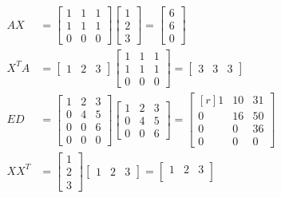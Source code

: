 \begin{align*}
	A X
	&=
	\begin{bmatrix*}
		1 & 1 & 1\\
		1 & 1 & 1\\
		0 & 0 & 0
	\end{bmatrix*}
	\begin{bmatrix*}
		1\\
		2\\
		3
	\end{bmatrix*}
	=
	\begin{bmatrix*}
		6\\
		6\\
		0
	\end{bmatrix*}\\
	X^T A
	&=
	\begin{bmatrix*}
		1 & 2 & 3
	\end{bmatrix*}
	\begin{bmatrix*}
		1 & 1 & 1\\
		1 & 1 & 1\\
		0 & 0 & 0
	\end{bmatrix*}
	=
	\begin{bmatrix*}
		3 & 3 & 3
	\end{bmatrix*}
	\\
	E D
	&=
	\begin{bmatrix*}
		1 & 2 & 3\\
		0 & 4 & 5\\
		0 & 0 & 6\\
		0 & 0 & 0
	\end{bmatrix*}
	\begin{bmatrix*}
		1 & 2 & 3\\
		0 & 4 & 5\\
		0 & 0 & 6
	\end{bmatrix*}
	=
	\begin{bmatrix*}[r]
		1 & 10 & 31\\
		0 & 16 & 50\\
		0 & 0  & 36\\
		0 & 0  & 0
	\end{bmatrix*}
	\\
	X X^T
	&=
	\begin{bmatrix*}
		1\\
		2\\
		3
	\end{bmatrix*}
	\begin{bmatrix*}
		1 & 2 & 3
	\end{bmatrix*}
	=
	\begin{bmatrix*}
		1 & 2 & 3\\

\end{bmatrix*}
\end{align*}

